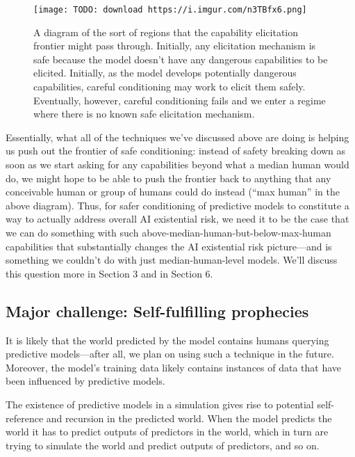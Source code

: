 {\begin{figure}[h!]
  \centering
  \texttt{[image: TODO: download https://i.imgur.com/n3TBfx6.png]}
  \caption{A diagram of the sort of regions that the capability elicitation frontier might pass through. Initially, any elicitation mechanism is safe because the model doesn't have any dangerous capabilities to be elicited. Initially, as the model develops potentially dangerous capabilities, careful conditioning may work to elicit them safely. Eventually, however, careful conditioning fails and we enter a regime where there is no known safe elicitation mechanism.}
\end{figure}

Essentially, what all of the techniques we've discussed above are doing is helping us push out the frontier of safe conditioning: instead of safety breaking down as soon as we start asking for any capabilities beyond what a median human would do, we might hope to be able to push the frontier back to anything that any conceivable human or group of humans could do instead (``max human'' in the above diagram). Thus, for safer conditioning of predictive models to constitute a way to actually address overall AI existential risk, we need it to be the case that we can do something with such above-median-human-but-below-max-human capabilities that substantially changes the AI existential risk picture---and is something we couldn't do with just median-human-level models. We'll discuss this question more in Section 3\cite{TODO: cite https://www.alignmentforum.org/posts/fj8faDDQEfvN2LQcW/conditioning-predictive-models-the-case-for-competitiveness} and in Section 6\cite{TODO: cite https://www.alignmentforum.org/posts/NXdTxyWy2PEXueKwi/conditioning-predictive-models-deployment-strategy}.


\subsection{Major challenge: Self-fulfilling prophecies}
\label{sec:2d}

It is likely that the world predicted by the model contains humans querying predictive models---after all, we plan on using such a technique in the future. Moreover, the model's training data likely contains instances of data that have been influenced by predictive models.

The existence of predictive models in a simulation gives rise to potential self-reference and recursion in the predicted world. When the model predicts the world it has to predict outputs of predictors in the world, which in turn are trying to simulate the world and predict outputs of predictors, and so on.

}
